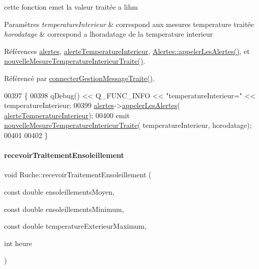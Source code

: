 cette fonction emet la valeur traitée a l\textquotesingle{}ihm 
\begin{DoxyParams}{Paramètres}
{\em temperature\+Interieur} & correspond aux mesures temperature traitée \\
\hline
{\em horodatage} & correspond a l\textquotesingle{}horadatage de la temperature interieur \\
\hline
\end{DoxyParams}


Références \hyperlink{class_ruche_af07644ddce44cb5ed4286475dc0f9d46}{alertes}, \hyperlink{parametres_8h_a83a725fd153179a2bd97afcc8307737ba6d07a737b602e59b2350e913e4763724}{alerte\+Temperature\+Interieur}, \hyperlink{class_alertes_ad04a02dcc6e6f14da0784c7054888b05}{Alertes\+::appeler\+Les\+Alertes()}, et \hyperlink{class_ruche_aa63b4fd7c695ef77c9ff4b684ed8ce91}{nouvelle\+Mesure\+Temperature\+Interieur\+Traite()}.



Référencé par \hyperlink{class_ruche_a20ec8c6dc931218e5cf682050fe845d9}{connecter\+Gestion\+Message\+Traite()}.


\begin{DoxyCode}
00397 \{
00398     qDebug() << Q\_FUNC\_INFO << \textcolor{stringliteral}{"temperatureInterieur="} << temperatureInterieur;    
00399     \hyperlink{class_ruche_af07644ddce44cb5ed4286475dc0f9d46}{alertes}->\hyperlink{class_alertes_ad04a02dcc6e6f14da0784c7054888b05}{appelerLesAlertes}(
      \hyperlink{parametres_8h_a83a725fd153179a2bd97afcc8307737ba6d07a737b602e59b2350e913e4763724}{alerteTemperatureInterieur});
00400     emit \hyperlink{class_ruche_aa63b4fd7c695ef77c9ff4b684ed8ce91}{nouvelleMesureTemperatureInterieurTraite}(
      temperatureInterieur, horodatage);
00401 
00402 \}
\end{DoxyCode}
\mbox{\label{class_ruche_a2ac5766ce8652084f034c498691488ea}} 
\paragraph{\texorpdfstring{recevoir\+Traitement\+Ensoleillement}{recevoirTraitementEnsoleillement}}
{\footnotesize\ttfamily void Ruche\+::recevoir\+Traitement\+Ensoleillement (\begin{DoxyParamCaption}\item[{const double}]{ensoleillements\+Moyen,  }\item[{const double}]{ensoleillements\+Minimum,  }\item[{const double}]{temperature\+Exterieur\+Maximum,  }\item[{int}]{heure }\end{DoxyParamCaption})\hspace{0.3cm}{\ttfamily [slot]}}



